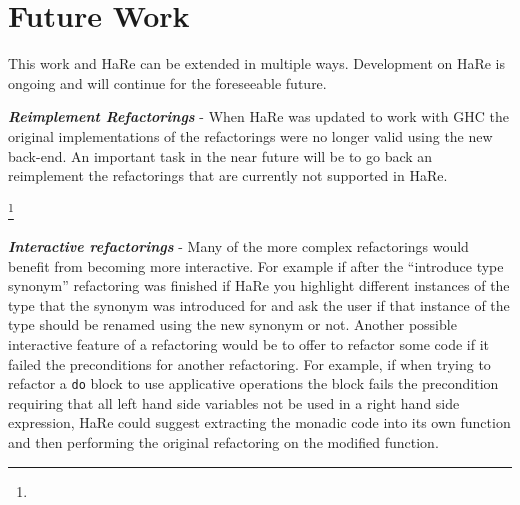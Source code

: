 \DIFdelend \section{Future Work}
This work and HaRe can be extended in multiple ways. Development on HaRe is ongoing and will continue for the foreseeable future. 

\textit{\textbf{Reimplement Refactorings}} - When HaRe was updated to work with GHC the original implementations of the refactorings were no longer valid using the new back-end. An important task in the near future will be to go back an reimplement the refactorings that are currently not supported in HaRe.  

\DIFdelbegin \textit{\textbf{}%
} %
\textit{}%
\footnote{%
} %
\addtocounter{footnote}{-1}%

\DIFdelend \textit{\textbf{Interactive refactorings}} - Many of the more complex refactorings would benefit from becoming more interactive. For example if after the ``introduce type synonym'' refactoring was finished if HaRe you highlight different instances of the type that the synonym was introduced for and ask the user if that instance of the type should be renamed using the new synonym or not. Another possible interactive feature of a refactoring would be to offer to refactor some code if it failed the preconditions for another refactoring. For example, if when trying to refactor a \texttt{do} block to use applicative operations the block fails the precondition requiring that all left hand side variables not be used in a right hand side expression, HaRe could suggest extracting the monadic code into its own function and then performing the original refactoring on the modified function.

